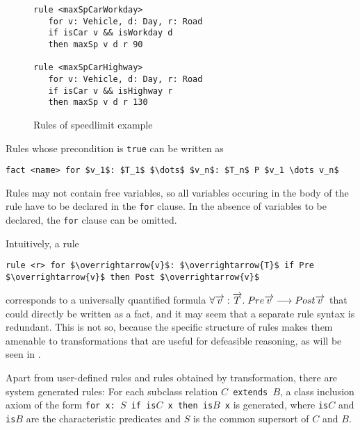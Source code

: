 \begin{figure}[h!]

  \begin{lstlisting}
rule <maxSpCarWorkday> 
   for v: Vehicle, d: Day, r: Road
   if isCar v && isWorkday d
   then maxSp v d r 90

rule <maxSpCarHighway>
   for v: Vehicle, d: Day, r: Road
   if isCar v && isHighway r
   then maxSp v d r 130
\end{lstlisting}

  \caption{Rules of speedlimit example}\label{fig:rules}
\end{figure}

Rules whose precondition is \texttt{true} can be written as

\begin{lstlisting}[frame=none,mathescape=true]
fact <name> for $v_1$: $T_1$ $\dots$ $v_n$: $T_n$ P $v_1 \dots v_n$
\end{lstlisting}

Rules may not contain free variables, so all variables occuring in the body of
the rule have to be declared in the \texttt{for} clause. In the absence of
variables to be declared, the \texttt{for} clause can be omitted.

Intuitively, a rule

\begin{lstlisting}[frame=none,mathescape=true]
  rule <r> for $\overrightarrow{v}$: $\overrightarrow{T}$ if Pre $\overrightarrow{v}$ then Post $\overrightarrow{v}$
\end{lstlisting}
corresponds to a universally quantified formula
$\forall \overrightarrow{v} : \overrightarrow{T}.\; Pre \overrightarrow{v}
\longrightarrow Post \overrightarrow{v}$ that could directly be written as a fact,
and it may seem that a separate rule syntax is redundant. This is not so,
because the specific structure of rules makes them amenable to transformations
that are useful for defeasible reasoning, as will be seen in .

Apart from user-defined rules and rules obtained by transformation, there are
system generated rules: For each subclass relation \texttt{$C$ extends $B$}, a
class inclusion axiom of the form \texttt{for x: $S$ if is$C$ x then is$B$ x}
is generated, where \texttt{is$C$} and \texttt{is$B$} are the characteristic
predicates and $S$ is the common supersort of $C$ and $B$.


